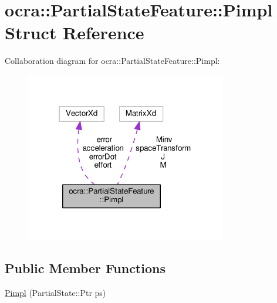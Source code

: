 \hypertarget{structocra_1_1PartialStateFeature_1_1Pimpl}{}\section{ocra\+:\+:Partial\+State\+Feature\+:\+:Pimpl Struct Reference}
\label{structocra_1_1PartialStateFeature_1_1Pimpl}


Collaboration diagram for ocra\+:\+:Partial\+State\+Feature\+:\+:Pimpl\+:
\nopagebreak
\begin{figure}[H]
\begin{center}
\leavevmode
\includegraphics[width=249pt]{d9/d83/structocra_1_1PartialStateFeature_1_1Pimpl__coll__graph}
\end{center}
\end{figure}
\subsection*{Public Member Functions}
\begin{DoxyCompactItemize}
\item 
\hyperlink{structocra_1_1PartialStateFeature_1_1Pimpl_ab528ba7c9763bcdee5e89cca9a18defd}{Pimpl} (Partial\+State\+::\+Ptr ps)
\end{DoxyCompactItemize}
